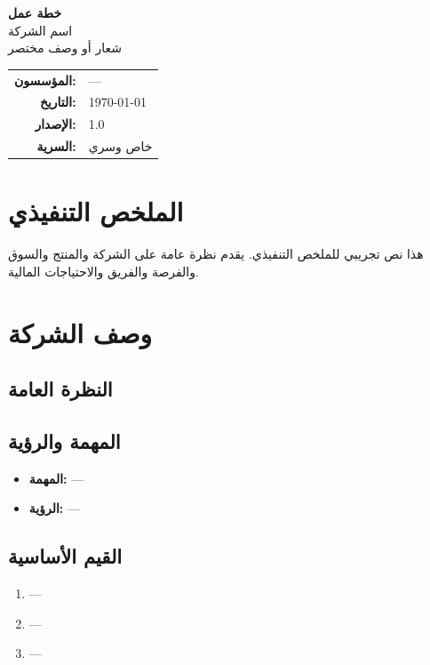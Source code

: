 \documentclass[11pt,a4paper]{article}
\begin{document}
\thispagestyle{empty}
\begin{center}
\vspace*{3cm}
{\Huge\bfseries خطة عمل}\\[1em]
{\LARGE اسم الشركة}\\[2em]
{\Large شعار أو وصف مختصر}\\[3em]

\begin{tabular}{rl}
\textbf{المؤسسون:} & --- \\
\textbf{التاريخ:} & \today \\
\textbf{الإصدار:} & 1.0 \\
\textbf{السرية:} & خاص وسري \\
\end{tabular}
\end{center}

\newpage

\section{الملخص التنفيذي}
\label{sec:summary}

هذا نص تجريبي للملخص التنفيذي. يقدم نظرة عامة على الشركة والمنتج والسوق والفرصة والفريق والاحتياجات المالية.

\section{وصف الشركة}
\label{sec:company}

\subsection{النظرة العامة}
\subsection{المهمة والرؤية}
\begin{itemize}
    \item \textbf{المهمة:} ---
    \item \textbf{الرؤية:} ---
\end{itemize}

\subsection{القيم الأساسية}
\begin{enumerate}
    \item ---
    \item ---
    \item ---
\end{enumerate}
\end{document}
